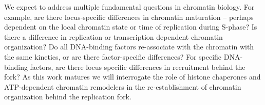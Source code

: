 We expect to address multiple fundamental questions in chromatin biology.  For example, are there locus-specific differences in chromatin maturation -- perhaps dependent on the local chromatin state or time of replication during S-phase? Is there a difference in replication or transcription dependent chromatin organization? Do all DNA-binding factors re-associate with the chromatin with the same kinetics, or are there factor-specific differences?  For specific DNA-binding factors, are there locus specific differences in recruitment behind the fork?  As this work matures we will interrogate the role of histone chaperones and ATP-dependent chromatin remodelers in the re-establishment of chromatin organization behind the replication fork.  













